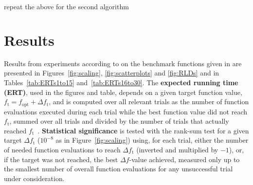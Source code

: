 \documentclass{sig-alternate}
\newcommand{\Df}{\ensuremath{\Delta f}}
\newcommand{\fopt}{\ensuremath{f_\mathrm{opt}}}
\newcommand{\ftarget}{\ensuremath{f_\mathrm{t}}}
\newcommand{\change}[1]{{\color{red} #1}}
\begin{document}
\change{repeat the above for the second algorithm}


\section{Results}

Results from experiments according to \cite{hansen2012exp} on the benchmark
functions given in \cite{wp200902_2010,hansen2012noi} are presented in
Figures~\ref{fig:scaling}, \ref{fig:scatterplots} and \ref{fig:RLDs} and
in Tables~\ref{tab:ERTs1to15} and~\ref{tab:ERTs16to30}. The \textbf{expected running time (ERT)}, used in the figures and table, depends on a
given target function value, $\ftarget=\fopt+\Delta\ftarget$, and is computed over all relevant trials
as the number of function evaluations executed during each trial while the best
function value did not reach \ftarget, summed over all trials
and divided by the number of trials that actually reached \ftarget\
\cite{hansen2012exp,price1997dev}. 
\textbf{Statistical significance} is tested with the rank-sum test for a given
target $\Delta\ftarget$ ($10^{-8}$ as in Figure~\ref{fig:scaling}) using,
for each trial, either the number of needed function evaluations to reach
$\Delta\ftarget$ (inverted and multiplied by $-1$), or, if the target was not
reached, the best $\Df$-value achieved, measured only up to the smallest number
of overall function evaluations for any unsuccessful trial under consideration. 


\end{document}

